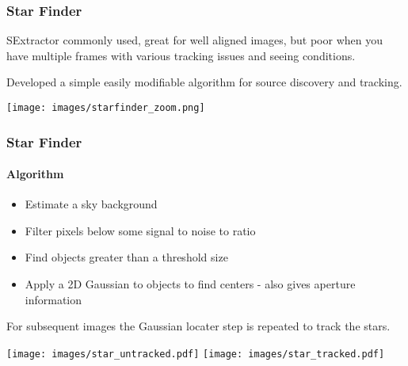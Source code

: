 \documentclass{beamer}
\begin{document}
  \begin{frame}
  \frametitle{Star Finder}
  SExtractor commonly used, great for well aligned images, but poor when you have multiple frames with various tracking issues and seeing conditions.

  Developed a simple easily modifiable algorithm for source discovery and tracking.
  \begin{center}
    \texttt{[image: images/starfinder\_zoom.png]}
  \end{center}
  \end{frame}
  \begin{frame}
  \frametitle{Star Finder}
    \framesubtitle{Algorithm}
    \begin{itemize}
        \item Estimate a sky background
        \item Filter pixels below some signal to noise to ratio
        \item Find objects greater than a threshold size
        \item Apply a 2D Gaussian to objects to find centers - also gives aperture information
    \end{itemize}
    For subsequent images the Gaussian locater step is repeated to track the stars.
    \begin{center}
        \texttt{[image: images/star\_untracked.pdf]}\quad
        \texttt{[image: images/star\_tracked.pdf]}
    \end{center}
  \end{frame}
\end{document}
